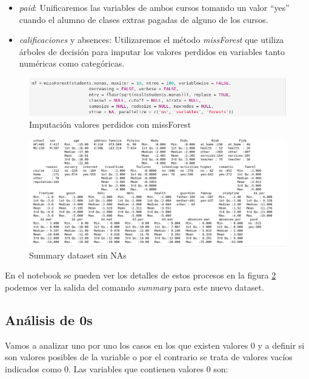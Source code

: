 \documentclass[12pt,a4paper]{article}
\begin{document}
\begin{itemize}
	\item \textit{paid}: Unificaremos las variables de ambos cursos tomando un valor ``yes'' cuando el alumno de clases extras pagadas de alguno de los cursos.
	\item \textit{calificaciones} y {absences}: Utilizaremos el método \textit{missForest} que utiliza árboles de decisión para imputar los valores perdidos en variables tanto numéricas como categóricas.  
	 
\end{itemize}

 \begin{figure}[ht!]
	\centering
	\includegraphics[trim = 0mm 0mm 0mm 0mm, clip,scale=05]{images/nonas_cal}
	\caption{Imputación valores perdidos con missForest}
	\label{fig:nonas_cal}
\end{figure}



 \begin{figure}[ht!]
	\centering
	\includegraphics[trim = 0mm 0mm 0mm 0mm, clip,scale=0.4]{images/summary_nonas}
	\caption{Summary dataset sin NAs}
	\label{fig:sum2}
\end{figure}



En el notebook se pueden ver los detalles de estos procesos en la figura \ref{fig:sum2} podemos ver la salida del comando \textit{summary} para este nuevo dataset.


\subsection{Análisis de 0s}
Vamos a analizar uno por uno los casos en los que existen valores 0 y a definir si son valores posibles de la variable o por el contrario se trata de valores vacíos indicados como 0. Las variables que contienen valores 0 son:
\end{document}
